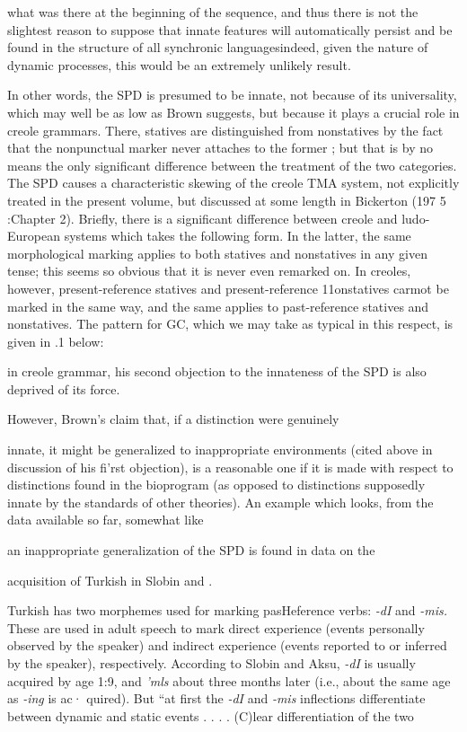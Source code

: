 
what was there at the beginning of the sequence, and thus there is not the slightest reason to suppose that innate features will automati\-cally persist and be found in the structure of all synchronic languages\-indeed, given the nature of dynamic processes, this would be an ex\-tremely unlikely result.

In other words, the SPD is presumed to be innate, not because of its universality, which may well be as low as Brown suggests, but because it plays a crucial role in creole grammars. There, statives are distinguished from nonstatives by the fact that the nonpunctual marker never attaches to the former ; but that is by no means the only signifi\-cant difference between the treatment of the two categories. The SPD causes a characteristic skewing of the creole TMA system, not explicitly treated in the present volume, but discussed at some length in Bicker\-ton (197 5 :Chapter 2). Briefly, there is a significant difference between creole and ludo-European systems which takes the following form. In the latter, the same morphological marking applies to both statives and nonstatives in any given tense; this seems so obvious that it is never even remarked on. In creoles, however, present-reference statives and present-reference 11onstatives carmot be marked in the same way, and the same applies to past-reference statives and nonstatives. The pattern for GC, which we may take as typical in this respect, is given in .1 below:


in creole grammar, his second objection to the innateness of the SPD is also deprived of its force.

However, Brown's claim that, if a distinction were genuinely

innate, it might be generalized to inappropriate environments (cited above in discussion of his fi'rst objection), is a reasonable one if it is made with respect to distinctions found in the bioprogram (as opposed to distinctions supposedly innate by the standards of other theories). An example which looks, from the data available so far, somewhat like

an inappropriate generalization of the SPD is found in data on the

acquisition of Turkish in Slobin and \citet{Aksu1980}.

Turkish has two morphemes used for marking pasHeference verbs: \textit{{}-dI} and \textit{{}-}\textit{m}\textit{i}\textit{s.} These are used in adult speech to mark direct experience (events personally observed by the speaker) and indirect experience (events reported to or inferred by the speaker), respectively. According to Slobin and Aksu, \textit{{}-dI} is usually acquired by age 1:9, and \textit{'mls} about three months later (i.e., about the same age as \textit{{}-i}\textit{n}\textit{g} is ac· quired). But ``at first the \textit{{}-dI} and \textit{{}-}\textit{m}\textit{i}\textit{s} inflections differentiate between dynamic and static events . . . . (C)lear differentiation of the two

